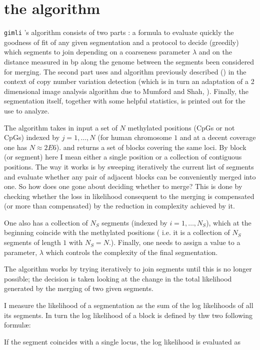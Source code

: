 \documentclass[11pt]{amsart}
\newcommand{\gimli}{\texttt{gimli} }
\begin{document}
\section{the algorithm}

\gimli's algorithm consists of two parts : 
a formula to evaluate quickly the 
goodness of fit of any given segmentation
and a protocol to decide (greedily) which  segments to join depending 
on a coarseness parameter $\lambda$ and on the distance measured in bp along
the genome between the segments been considered for merging. 
The second part uses and  algorithm previously described   (\cite{vega}) in 
the context of copy number variation detection (which is in turn an adaptation 
of a 2 dimensional image analysis algorithm due to Mumford and Shah, 
\cite{mumfordshah}). Finally, the segmentation itself, together with some 
helpful statistics, is printed out for the use to analyze.

The algorithm takes in input a set of $N$ methylated positions 
(CpGs or not CpGs) indexed by $j=1,\dots,N$ 
(for human chromosome $1$ and at a 
decent coverage one has $N \approx 2E6$).
and returns a set of blocks covering the same loci.
By block (or segment) here I mean either a single position or a collection
of contiguous positions. The way it works is by sweeping
iteratively the current list of segments and evaluate whether any pair 
of adjacent blocks can be conveniently merged into one. So how does one gone 
about deciding whether to merge? This is  done by checking whether the loss in 
likelihood consequent to the merging is compensated (or more than compensated)
by the reduction in complexity achieved by it.

One also has a collection of $N_S$ 
segments (indexed by $i=1,\dots,N_S$), 
which at the beginning
coincide with the methylated positions ( i.e. it is a collection of $N_S$ 
segments of length $1$ with $N_S=N$.).
Finally, one needs to assign a value to a parameter, $\lambda$ which controls the 
complexity of the final segmentation.

The algorithm works by trying iteratively to join segments until this
is no longer possible; the decision is taken looking at the change
in the total likelihood generated by the merging of two given segments. 

I measure the likelihood of a segmentation as the sum of the log likelihoods
of all its segments. In turn the log likelihood of a block is defined by thw
two following formul\ae:

If the
segment coincides with a single locus, 
the log likelihood  is evaluated as 
\end{document}
